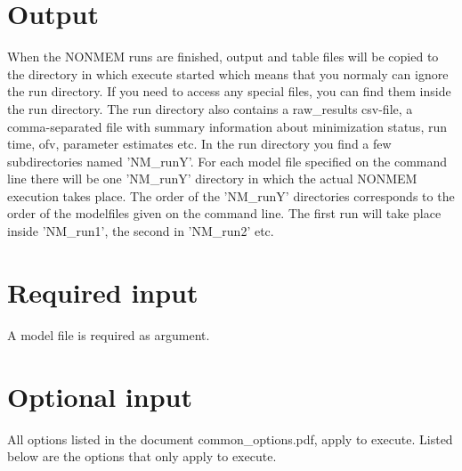 \section{Output}
When the NONMEM runs are finished, output and table files will be copied to the directory in which execute started which means 
that you normaly can ignore the run directory. If you need to access any special files, you can find them inside the run directory. 
The run directory also contains a raw\_results csv-file, a comma-separated file with summary information about minimization status, 
run time, ofv, parameter estimates etc. In the run directory you find a few subdirectories named 'NM\_runY'. For each model file 
specified on the command line there will be one 'NM\_runY' directory in which the actual NONMEM execution takes place. 
The order of the 'NM\_runY' directories corresponds to the order of the modelfiles given on the command line. The first run will take 
place inside 'NM\_run1', the second in 'NM\_run2' etc.

\section{Required input}
A model file is required as argument.
	
\section{Optional input}
All options listed in the document common\_options.pdf, apply to execute. Listed below are the options that only apply to execute. 
		
\renewcommand{\guidetoolname}{execute}
			

